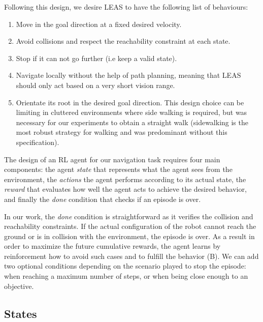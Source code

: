 Following this design, we desire LEAS to have the following list of behaviours:
\begin{enumerate}[label=(\Alph*)]
  \item Move in the goal direction at a fixed desired velocity.
  \item Avoid collisions and respect the reachability constraint at each state. 
  \item Stop if it can not go further (i.e keep a valid state).
  \item Navigate locally without the help of path planning, meaning that LEAS should only act based on a very short vision range.
  \item Orientate its root in the desired goal direction. This design choice can be limiting in cluttered environments where side walking is required, but was necessary for our experiments to obtain a straight walk (sidewalking is the most robust strategy for walking and was predominant without this specification).
\label{list:leas:specifications}
\end{enumerate}

The design of an RL agent for our navigation task requires four main components: 
the agent \textit{state} that represents what the agent sees from the environment, the \textit{actions} the agent performs according to its actual state, the \textit{reward} that evaluates how well the agent acts to achieve the desired behavior, and finally the \textit{done} condition that checks if an episode is over.

In our work, the \textit{done} condition is straightforward as it verifies the collision and reachability constraints. If the actual configuration of the robot cannot reach the ground or is in collision with the environment, the episode is over. 
As a result in order to maximize the future cumulative rewards, the agent learns by reinforcement how to avoid such cases and to fulfill the behavior (B). 
We can add two optional conditions depending on the scenario played to stop the episode: when reaching a maximum number of steps, or when being close enough to an objective.





\subsection{States\label{subsubsec:states}}

